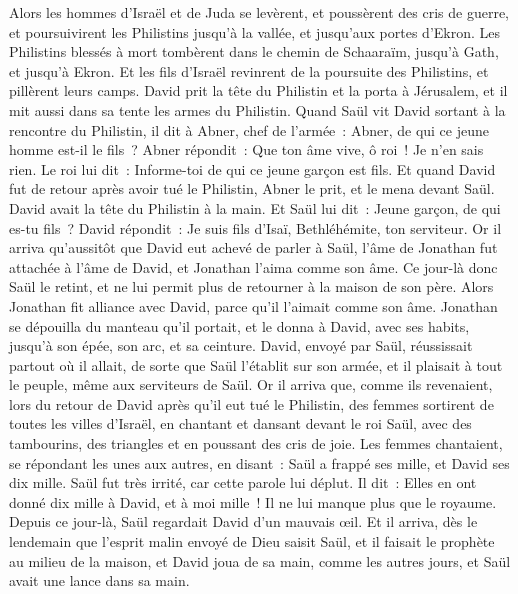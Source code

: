 \begin{multicols}{2}
Alors les hommes d'Israël et de Juda se levèrent, et poussèrent des cris de guerre, et poursuivirent les Philistins jusqu'à la vallée, et jusqu'aux portes d'Ekron. Les Philistins blessés à mort tombèrent dans le chemin de Schaaraïm, jusqu'à Gath, et jusqu'à Ekron.
Et les fils d'Israël revinrent de la poursuite des Philistins, et pillèrent leurs camps.
David prit la tête du Philistin et la porta à Jérusalem, et il mit aussi dans sa tente les armes du Philistin.
Quand Saül vit David sortant à la rencontre du Philistin, il dit à Abner, chef de l'armée~: Abner, de qui ce jeune homme est-il le fils~? Abner répondit~: Que ton âme vive, ô roi~! Je n'en sais rien.
Le roi lui dit~: Informe-toi de qui ce jeune garçon est fils.
Et quand David fut de retour après avoir tué le Philistin, Abner le prit, et le mena devant Saül. David avait la tête du Philistin à la main.
Et Saül lui dit~: Jeune garçon, de qui es-tu fils~? David répondit~: Je suis fils d'Isaï, Bethléhémite, ton serviteur.
\VerseOne{}Or il arriva qu'aussitôt que David eut achevé de parler à Saül, l'âme de Jonathan fut attachée à l'âme de David, et Jonathan l'aima comme son âme.
Ce jour-là donc Saül le retint, et ne lui permit plus de retourner à la maison de son père.
Alors Jonathan fit alliance avec David, parce qu'il l'aimait comme son âme.
Jonathan se dépouilla du manteau qu'il portait, et le donna à David, avec ses habits, jusqu'à son épée, son arc, et sa ceinture.
David, envoyé par Saül, réussissait partout où il allait, de sorte que Saül l'établit sur son armée, et il plaisait à tout le peuple, même aux serviteurs de Saül.
Or il arriva que, comme ils revenaient, lors du retour de David après qu'il eut tué le Philistin, des femmes sortirent de toutes les villes d'Israël, en chantant et dansant devant le roi Saül, avec des tambourins, des triangles et en poussant des cris de joie.
Les femmes chantaient, se répondant les unes aux autres, en disant~: Saül a frappé ses mille, et David ses dix mille.
Saül fut très irrité, car cette parole lui déplut. Il dit~: Elles en ont donné dix mille à David, et à moi mille~! Il ne lui manque plus que le royaume.
Depuis ce jour-là, Saül regardait David d'un mauvais œil.
Et il arriva, dès le lendemain que l'esprit malin envoyé de Dieu saisit Saül, et il faisait le prophète au milieu de la maison, et David joua de sa main, comme les autres jours, et Saül avait une lance dans sa main.

\end{multicols}
